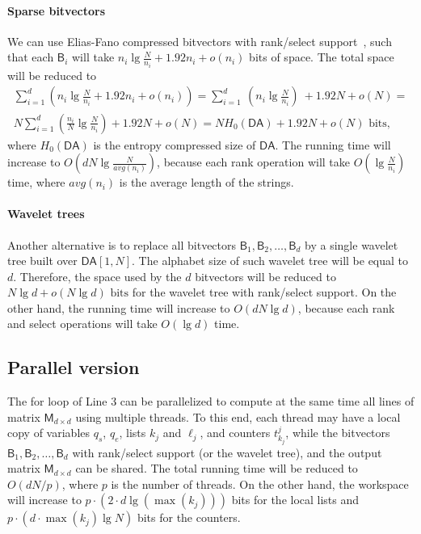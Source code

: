 \documentclass{elsarticle}
\newcommand{\DA}{\ensuremath{\mathsf{DA}}\xspace}
\newcommand{\BM}{\ensuremath{\mathsf{B}}\xspace}
\newcommand{\proc}{\ensuremath{p}\xspace}
\newcommand{\Md}{\ensuremath{\mathsf{M}}\xspace}
\begin{document}
\paragraph{Sparse bitvectors}
We can use Elias-Fano compressed bitvectors with rank/select support~\cite{Okanohara2007}, such that
each $\BM_i$ will take $n_i \lg \frac{N}{n_i} + 1.92n_i + o(n_i)$ bits of space.
The total space will be reduced to
\begin{align*}
\sum_{i=1}^d( n_i \lg \frac{N}{n_i} + 1.92n_i + o(n_i)) =
\sum_{i=1}^d~(n_i\lg\frac{N}{n_i})~+ 1.92N + o(N) =\\
N \sum_{i=1}^d (\frac{n_i}{N} \lg \frac{N}{n_i}) + 1.92N +o(N) =
N H_0(\DA) + 1.92N + o(N) \mbox{ bits,}
\end{align*}
where $H_0(\DA)$ is the entropy compressed size of \DA.
The running time will increase to $O(d N \lg{\frac{N}{avg(n_i)}})$,
because each rank operation will take $O(\lg{\frac{N}{n_i}})$ time, where $avg(n_i)$ is the average length of the strings.

\paragraph{Wavelet trees}
Another alternative is to replace all bitvectors $\BM_1, \BM_2, \dots, \BM_d$ by a single
wavelet tree built over $\DA[1,N]$.
The alphabet size of such wavelet tree will be equal to $d$.
Therefore, the space used by the $d$ bitvectors will be reduced to $N\lg d + o(N\lg d) \mbox{ bits}$
for the wavelet tree with rank/select support.
On the other hand, the running time will increase to $O(dN\lg d)$, because
each rank and select
operations will take $O(\lg d)$ time.


\subsection{Parallel version}\label{s:par1}

The for loop of Line 3 can be parallelized to compute at the same time all lines of
matrix $\Md_{d\times d}$ using multiple threads.
To this end, each thread may have a local
copy of variables $q_s$, $q_e$, lists $k_{j}$ and $\ell_j$, and
counters $t^{j}_{k_j}$,
while the bitvectors $\BM_1, \BM_2, \dots, \BM_d$ with
rank/select support (or the wavelet tree), and the output matrix $\Md_{d\times d}$ can be shared.
The total running time will be reduced to $O(dN/\proc)$, where \proc is the number
of threads.
On the other hand,
the workspace will increase to $\proc \cdot (2 \cdot d \lg (\max(k_j)))$ bits for the local lists
and $\proc \cdot (d \cdot \max(k_j) \lg N)$ bits for the counters.
\end{document}
